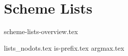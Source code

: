 \documentclass{exam}
\begin{document}
\section{Scheme Lists}
{scheme-lists-overview.tex}
\newpage
\begin{questions}
{lists_nodots.tex}
{is-prefix.tex}
{argmax.tex}


\end{questions}
\end{document}
